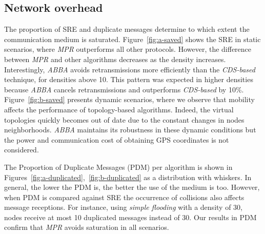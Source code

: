 %
%
\subsection{Network overhead}

The proportion of SRE and duplicate messages determine to which extent the communication medium is saturated.
%
Figure~\ref{fig:a-saved} shows the SRE in static scenarios, where \emph{MPR} outperforms all other protocols.
%
However, the difference between \emph{MPR} and other algorithms decreases as the density increases.
%
Interestingly, \emph{ABBA} avoids retransmissions more efficiently than the \emph{CDS-based} technique, for densities above 10.
%
This pattern was expected in higher densities because \emph{ABBA} cancels retransmissions and outperforms \emph{CDS-based} by 10\%.
%
Figure~\ref{fig:b-saved} presents dynamic scenarios, where we observe that mobility affects the performance of topology-based algorithms.
%
Indeed, the virtual topologies quickly becomes out of date due to the constant changes in nodes neighborhoods.
%
%
\emph{ABBA} maintains its robustness in these dynamic conditions but the power and communication cost of obtaining GPS coordinates is not considered.

The Proportion of Duplicate Messages (PDM) per algorithm is shown in Figures~\ref{fig:a-duplicated},~\ref{fig:b-duplicated} as a distribution with whiskers.
%
%
In general, the lower the PDM is, the better the use of the medium is too. 
%
However, when PDM is compared against SRE the occurrence of collisions also affects message receptions.
%
For instance, using \emph{simple flooding} with a density of 30, nodes receive at most 10 duplicated messages instead of 30.
%
%
Our results in PDM confirm that \emph{MPR} avoids saturation in all scenarios.
%
%

